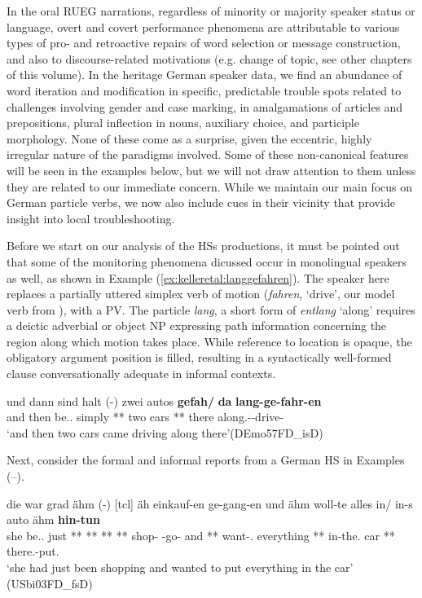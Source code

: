 \documentclass[output=paper,colorlinks,citecolor=brown]{langscibook}
\begin{document}
In the oral RUEG narrations, regardless of minority or majority speaker status or language, overt and covert performance phenomena are attributable to various types of pro- and retroactive repairs of word selection or message construction, and also to discourse-related motivations (e.g. change of topic, see other chapters of this volume). In the heritage German speaker data, we find an abundance of word iteration and modification in specific, predictable trouble spots related to challenges involving gender and case marking, in amalgamations of articles and prepositions, plural inflection in nouns, auxiliary choice, and participle morphology. None of these come as a surprise, given the eccentric, highly irregular nature of the paradigms involved. Some of these non-canonical features will be seen in the examples below, but we will not draw attention to them unless they are related to our immediate concern. While we maintain our main focus on German particle verbs, we now also include cues in their vicinity that provide insight into local troubleshooting. 

Before we start on our analysis of the HSs productions, it must be pointed out that some of the monitoring phenomena dicussed occur in monolingual speakers as well, as shown in Example (\ref{ex:kelleretal:langgefahren}). The speaker here replaces a partially uttered simplex verb of motion (\textit{fahren}, `drive', our model verb from ), with a PV. The particle \textit{lang}, a short form of \textit{entlang} `along' requires a deictic adverbial or object NP expressing path information concerning the region along which motion takes place. While reference to location is opaque, the obligatory argument position is filled, resulting in a syntactically well-formed clause conversationally adequate in informal contexts.

\ea
\label{ex:kelleretal:langgefahren}
\gll und dann sind halt (-) zwei autos \textbf{gefah/} \textbf{da} \textbf{lang-ge-fahr-en} \\
and then be.\Prs.\Tpl{} simply {**} two cars {**} there along.\Vpart{}-\Ptcp{}-drive-\Ptcp{} \\
\glt `and then two cars came driving along there'(DEmo57FD\_isD)
\z

Next, consider the formal and informal reports from a German HS in Examples (--).

\ea
\label{ex:kelleretal:hintun}
\gll die war grad ähm (-) [tcl] äh einkauf-en ge-gang-en und ähm woll-te alles in/ in-s auto ähm \textbf{hin-tun} \\
she be.\Pst.\Tsg{} just {**} {**} {**} {**} shop-\Inf{} \Ptcp{}-go-\Ptcp{} and {**} want-\Pst.\Tsg{} everything {**} in-the.\Acc{} car {**} there.\Vpart{}-put.\Inf{}\\
\glt `she had just been shopping and wanted to put everything in the car' (USbi03FD\_fsD)
\end{document}

